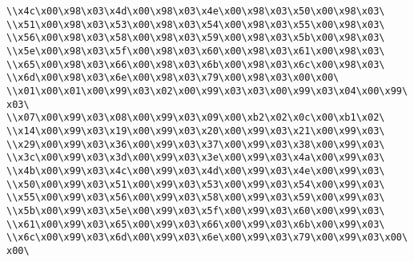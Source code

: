 \verb|\\x4c\x00\x98\x03\x4d\x00\x98\x03\x4e\x00\x98\x03\x50\x00\x98\x03\|\newline
\verb|\\x51\x00\x98\x03\x53\x00\x98\x03\x54\x00\x98\x03\x55\x00\x98\x03\|\newline
\verb|\\x56\x00\x98\x03\x58\x00\x98\x03\x59\x00\x98\x03\x5b\x00\x98\x03\|\newline
\verb|\\x5e\x00\x98\x03\x5f\x00\x98\x03\x60\x00\x98\x03\x61\x00\x98\x03\|\newline
\verb|\\x65\x00\x98\x03\x66\x00\x98\x03\x6b\x00\x98\x03\x6c\x00\x98\x03\|\newline
\verb|\\x6d\x00\x98\x03\x6e\x00\x98\x03\x79\x00\x98\x03\x00\x00\|\newline
\verb|\\x01\x00\x01\x00\x99\x03\x02\x00\x99\x03\x03\x00\x99\x03\x04\x00\x99\x03\|\newline
\verb|\\x07\x00\x99\x03\x08\x00\x99\x03\x09\x00\xb2\x02\x0c\x00\xb1\x02\|\newline
\verb|\\x14\x00\x99\x03\x19\x00\x99\x03\x20\x00\x99\x03\x21\x00\x99\x03\|\newline
\verb|\\x29\x00\x99\x03\x36\x00\x99\x03\x37\x00\x99\x03\x38\x00\x99\x03\|\newline
\verb|\\x3c\x00\x99\x03\x3d\x00\x99\x03\x3e\x00\x99\x03\x4a\x00\x99\x03\|\newline
\verb|\\x4b\x00\x99\x03\x4c\x00\x99\x03\x4d\x00\x99\x03\x4e\x00\x99\x03\|\newline
\verb|\\x50\x00\x99\x03\x51\x00\x99\x03\x53\x00\x99\x03\x54\x00\x99\x03\|\newline
\verb|\\x55\x00\x99\x03\x56\x00\x99\x03\x58\x00\x99\x03\x59\x00\x99\x03\|\newline
\verb|\\x5b\x00\x99\x03\x5e\x00\x99\x03\x5f\x00\x99\x03\x60\x00\x99\x03\|\newline
\verb|\\x61\x00\x99\x03\x65\x00\x99\x03\x66\x00\x99\x03\x6b\x00\x99\x03\|\newline
\verb|\\x6c\x00\x99\x03\x6d\x00\x99\x03\x6e\x00\x99\x03\x79\x00\x99\x03\x00\x00\|\newline

